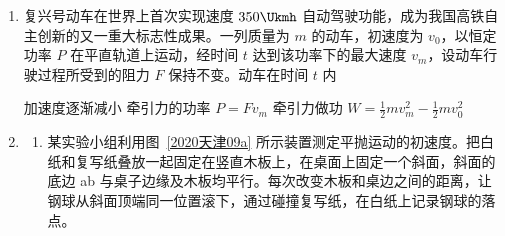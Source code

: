 \documentclass[\gkver]{gaokaozhenti}
\begin{document}
\begin{enumerate}
{

由于速度方向与 $y$ 轴正方向的夹角 $\theta=45^{\circ}$，根据几何关系可知 $\angle OMO_{1}=\angle OO_{1}M=45^{\circ}$，$OM=OO_{1}=a$

则粒子运动的轨道半径为 $r=O_{1}M=\sqrt{2}a$

洛伦兹力提供向心力 $qvB=m\frac{v^{2}}{r}$

解得 $v=\frac{\sqrt{2}qBa}{m}$

BC 错误；

D．N 与 O 点的距离为 $NO=OO_{1}+r=(\sqrt{2}+1)a$，D 正确。

故选 AD。
}

\item
复兴号动车在世界上首次实现速度 $350\Ukmh$ 自动驾驶功能，成为我国高铁自主创新的又一重大标志性成果。一列质量为 $m$ 的动车，初速度为 $v_{0}$，以恒定功率 $P$ 在平直轨道上运动，经时间 $t$ 达到该功率下的最大速度 $v_{m}$，设动车行驶过程所受到的阻力 $F$ 保持不变。动车在时间 $t$ 内


{加速度逐渐减小}
{牵引力的功率 $P=Fv_{m}$}
{牵引力做功 $W=\frac{1}{2}mv_{m}^{2}-\frac{1}{2}mv_{0}^{2}$}

\item
\begin{enumerate}
	\item
	某实验小组利用图~\ref{2020天津09a} 所示装置测定平抛运动的初速度。把白纸和复写纸叠放一起固定在竖直木板上，在桌面上固定一个斜面，斜面的底边 ab 与桌子边缘及木板均平行。每次改变木板和桌边之间的距离，让钢球从斜面顶端同一位置滚下，通过碰撞复写纸，在白纸上记录钢球的落点。


\end{enumerate}
\end{enumerate}
\end{document}
